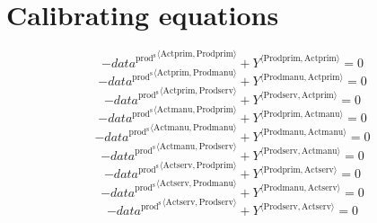 \section{Calibrating equations}

\begin{equation}
-{{d\!a\!t\!a}^{\mathrm{prod}^{\mathrm{s}}}}^{\langle \mathrm{\mathrm{Actprim}},\mathrm{\mathrm{Prodprim}}\rangle} + {Y}^{\langle \mathrm{Prodprim},\mathrm{Actprim}\rangle} = 0
\end{equation}
\begin{equation}
-{{d\!a\!t\!a}^{\mathrm{prod}^{\mathrm{s}}}}^{\langle \mathrm{\mathrm{Actprim}},\mathrm{\mathrm{Prodmanu}}\rangle} + {Y}^{\langle \mathrm{Prodmanu},\mathrm{Actprim}\rangle} = 0
\end{equation}
\begin{equation}
-{{d\!a\!t\!a}^{\mathrm{prod}^{\mathrm{s}}}}^{\langle \mathrm{\mathrm{Actprim}},\mathrm{\mathrm{Prodserv}}\rangle} + {Y}^{\langle \mathrm{Prodserv},\mathrm{Actprim}\rangle} = 0
\end{equation}
\begin{equation}
-{{d\!a\!t\!a}^{\mathrm{prod}^{\mathrm{s}}}}^{\langle \mathrm{\mathrm{Actmanu}},\mathrm{\mathrm{Prodprim}}\rangle} + {Y}^{\langle \mathrm{Prodprim},\mathrm{Actmanu}\rangle} = 0
\end{equation}
\begin{equation}
-{{d\!a\!t\!a}^{\mathrm{prod}^{\mathrm{s}}}}^{\langle \mathrm{\mathrm{Actmanu}},\mathrm{\mathrm{Prodmanu}}\rangle} + {Y}^{\langle \mathrm{Prodmanu},\mathrm{Actmanu}\rangle} = 0
\end{equation}
\begin{equation}
-{{d\!a\!t\!a}^{\mathrm{prod}^{\mathrm{s}}}}^{\langle \mathrm{\mathrm{Actmanu}},\mathrm{\mathrm{Prodserv}}\rangle} + {Y}^{\langle \mathrm{Prodserv},\mathrm{Actmanu}\rangle} = 0
\end{equation}
\begin{equation}
-{{d\!a\!t\!a}^{\mathrm{prod}^{\mathrm{s}}}}^{\langle \mathrm{\mathrm{Actserv}},\mathrm{\mathrm{Prodprim}}\rangle} + {Y}^{\langle \mathrm{Prodprim},\mathrm{Actserv}\rangle} = 0
\end{equation}
\begin{equation}
-{{d\!a\!t\!a}^{\mathrm{prod}^{\mathrm{s}}}}^{\langle \mathrm{\mathrm{Actserv}},\mathrm{\mathrm{Prodmanu}}\rangle} + {Y}^{\langle \mathrm{Prodmanu},\mathrm{Actserv}\rangle} = 0
\end{equation}
\begin{equation}
-{{d\!a\!t\!a}^{\mathrm{prod}^{\mathrm{s}}}}^{\langle \mathrm{\mathrm{Actserv}},\mathrm{\mathrm{Prodserv}}\rangle} + {Y}^{\langle \mathrm{Prodserv},\mathrm{Actserv}\rangle} = 0
\end{equation}
